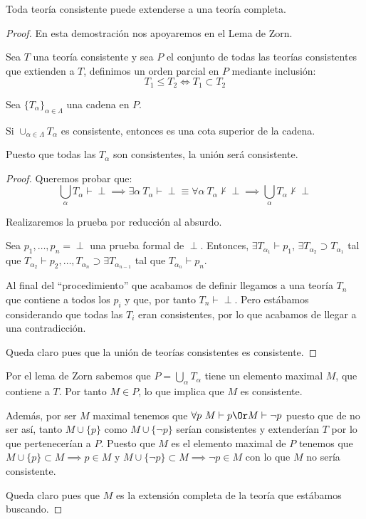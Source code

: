 \begin{theorem}
	Toda teoría consistente puede extenderse a una teoría completa.
	\label{thm:lindenbaum}
\end{theorem}
\begin{proof}
	En esta demostración nos apoyaremos en el Lema de Zorn.

	Sea $T$ una teoría consistente y sea $P$ el conjunto de todas las teorías consistentes que extienden a $T$, definimos un orden parcial en $P$ mediante inclusión:
	\[T_1\le T_2 \iff T_1\subset T_2\]

	Sea $\{T_\alpha\}_{\alpha\in\Lambda}$ una cadena en $P$.

	Si $\cup_{\alpha\in\Lambda} T_\alpha$ es consistente, entonces es una cota superior de la cadena.

	Puesto que todas las $T_\alpha$ son consistentes, la unión será consistente.
	\begin{proof}
	Queremos probar que:
	\[\bigcup_α T_α \vdash \perp \implies \exists α \ T_α \vdash \perp \equiv \forall α \ T_α \nvdash \perp \implies \bigcup_αT_α \nvdash \perp\]

	Realizaremos la prueba por reducción al absurdo.

	Sea $p_1,\hdots,p_n = \perp$ una prueba formal de $\perp$. Entonces, $\exists T_{\alpha_1}\vdash p_1$, $\exists T_{\alpha_2} \supset T_{\alpha_1}$ tal que $T_{\alpha_2}\vdash p_2, \hdots, T_{\alpha_n}\supset \exists T_{\alpha_{n-1}}$ tal que $T_{\alpha_n}\vdash p_n$.

	\obs Al final del ``procedimiento'' que acabamos de definir llegamos a una teoría $T_n$ que contiene a todos los $p_i$ y que, por tanto $T_n \vdash \perp$. Pero estábamos considerando que todas las $T_i$ eran consistentes, por lo que acabamos de llegar a una contradicción.

	Queda claro pues que la unión de teorías consistentes es consistente.
	\end{proof}

	Por el lema de Zorn sabemos que $P=\bigcup_αT_α$ tiene un elemento maximal $M$, que contiene a $T$. Por tanto $M\in P$, lo que implica que $M$ es consistente.

	Además, por ser $M$ maximal tenemos que $\forall p \ M \vdash p \Or M \vdash \neg p$ puesto que de no ser así, tanto $M\cup\{p\}$ como $M\cup\{\neg p\}$ serían consistentes y extenderían $T$ por lo que pertenecerían a $P$. Puesto que $M$ es el elemento maximal de $P$ tenemos que $M\cup\{p\} \subset M \implies p \in M$ y $M\cup\{\neg p\}\subset M \implies \neg p \in M$ con lo que $M$ no sería consistente.

	Queda claro pues que $M$ es la extensión completa de la teoría que estábamos buscando.
\end{proof}

